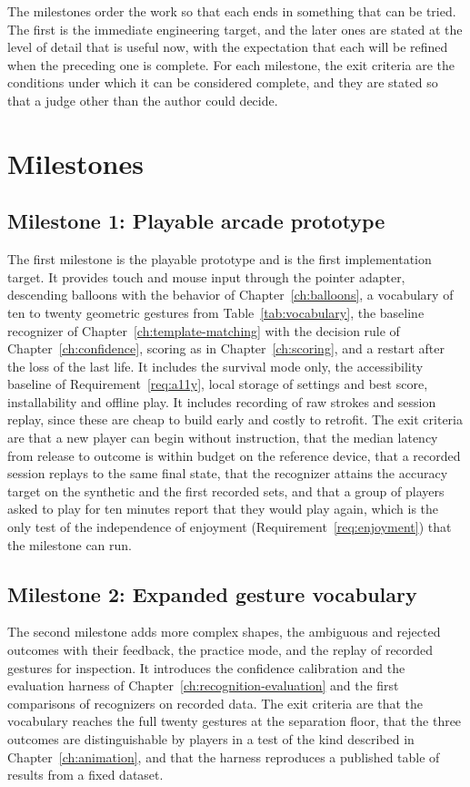 The milestones order the work so that each ends in something that can be tried. The first is the immediate engineering target, and the later ones are stated at the level of detail that is useful now, with the expectation that each will be refined when the preceding one is complete. For each milestone, the exit criteria are the conditions under which it can be considered complete, and they are stated so that a judge other than the author could decide.

\chapter{Milestones}\label{ch:milestones}

\section*{Milestone 1: Playable arcade prototype}

The first milestone is the playable prototype and is the first implementation target. It provides touch and mouse input through the pointer adapter, descending balloons with the behavior of Chapter~\ref{ch:balloons}, a vocabulary of ten to twenty geometric gestures from Table~\ref{tab:vocabulary}, the baseline recognizer of Chapter~\ref{ch:template-matching} with the decision rule of Chapter~\ref{ch:confidence}, scoring as in Chapter~\ref{ch:scoring}, and a restart after the loss of the last life. It includes the survival mode only, the accessibility baseline of Requirement~\ref{req:a11y}, local storage of settings and best score, installability and offline play. It includes recording of raw strokes and session replay, since these are cheap to build early and costly to retrofit. The exit criteria are that a new player can begin without instruction, that the median latency from release to outcome is within budget on the reference device, that a recorded session replays to the same final state, that the recognizer attains the accuracy target on the synthetic and the first recorded sets, and that a group of players asked to play for ten minutes report that they would play again, which is the only test of the independence of enjoyment (Requirement~\ref{req:enjoyment}) that the milestone can run.

\section*{Milestone 2: Expanded gesture vocabulary}

The second milestone adds more complex shapes, the ambiguous and rejected outcomes with their feedback, the practice mode, and the replay of recorded gestures for inspection. It introduces the confidence calibration and the evaluation harness of Chapter~\ref{ch:recognition-evaluation} and the first comparisons of recognizers on recorded data. The exit criteria are that the vocabulary reaches the full twenty gestures at the separation floor, that the three outcomes are distinguishable by players in a test of the kind described in Chapter~\ref{ch:animation}, and that the harness reproduces a published table of results from a fixed dataset.

